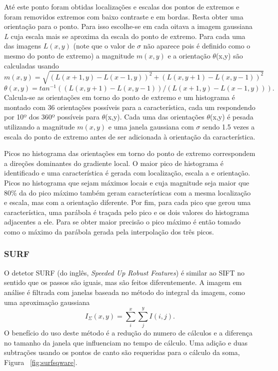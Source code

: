 Até este ponto foram obtidas localizações e escalas dos pontos de extremos e foram removidos extremos com baixo contraste e em bordas. Resta obter uma orientação para o ponto. Para isso escolhe-se em cada oitava a imagem gaussiana \textit{L} cuja escala mais se aproxima da escala do ponto de extremo. Para cada uma das imagens $\textit{L}(x,y)$  (note que o valor de $\sigma$ não aparece pois é definido como o mesmo do ponto de extremo) a magnitude $\textit{m}(x,y)$ e a orientação $\theta$(x,y) são calculadas usando \[ \textit{m}(x,y) = \sqrt{(\textit{L}(x  +1,y) - \textit{L}(x - 1,y))^2 + (\textit{L}(x,y + 1) - \textit{L}(x,y - 1))^2} \] \[ \theta (x,y) = \textit{tan}^{-1}((\textit{L}(x,y +1) - \textit{L}(x,y - 1))/(\textit{L}(x + 1,y) - \textit{L}(x - 1,y))).\]
Calcula-se as orientações em torno do ponto de extremo e um histograma é montado com 36 orientações possíveis para a característica, cada um respondendo por 10º dos 360º possíveis para $\theta$(x,y). Cada uma das orientações $\theta$(x,y) é pesada utilizando a magnitude $\textit{m}(x,y)$ e uma janela gaussiana com $\sigma$ sendo 1.5 vezes a escala do ponto de extremo antes de ser adicionada à orientação da característica.

Picos no histograma das orientações em torno do ponto de extremo correspondem a direções dominantes do gradiente local. O maior pico de histograma é identificado e uma característica é gerada com localização, escala a e orientação. Picos no histograma que sejam máximos locais e cuja magnitude seja maior que 80\% da do pico máximo também geram características com a mesma localização e escala, mas com a orientação diferente. Por fim, para cada pico que gerou uma característica, uma parábola é traçada pelo pico e os dois valores do histograma adjacentes a ele. Para se obter maior precisão o pico máximo é então tomado como o máximo da parábola gerada pela interpolação dos três picos.


\subsubsection{SURF}

O detetor SURF (do inglês, \textit{Speeded Up Robust Features}) é similar ao SIFT no sentido que os passos são iguais, mas são feitos diferentemente. A imagem em análise é filtrada com janelas baseada no método do integral da imagem, como uma aproximação gaussiana \begin{equation}\label{surfequation}
I_{\Sigma}(x,y) = \sum_{i}^{x}\sum_{j}^{y}{I(i,j)}. \end{equation}
O benefício do uso deste método é a redução do numero de cálculos e a diferença no tamanho da janela que influenciam no tempo de cálculo. Uma adição e duas subtrações usando os pontos de canto são requeridas para o cálculo da soma, Figura ~\ref{fig:surfsqware}.

